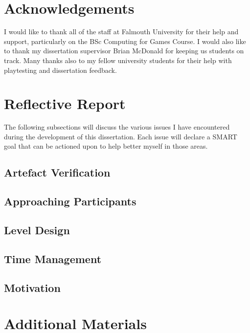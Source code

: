 \documentclass[journal]{IEEEtran}
\begin{document}





\appendices
\section{Acknowledgements}
I would like to thank all of the staff at Falmouth University for their help and support, particularly on the BSc Computing for Games Course. I would also like to thank my dissertation supervisor Brian McDonald for keeping us students on track. Many thanks also to my fellow university students for their help with playtesting and dissertation feedback.

\section{Reflective Report}
The following subsections will discuss the various issues I have encountered during the development of this dissertation. Each issue will declare a SMART goal that can be actioned upon to help better myself in those areas.

\subsection{Artefact Verification}

\subsection{Approaching Participants}

\subsection{Level Design}

\subsection{Time Management}

\subsection{Motivation}

\section{Additional Materials}
\end{document}
